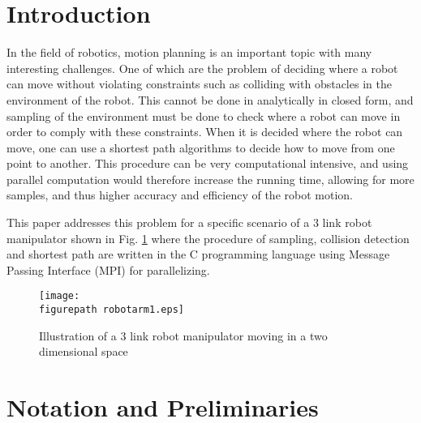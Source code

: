 
\newcommand{\figurepath}{./figures/}
\newcommand{\figurescale}{0.6}
\newcommand{\codepath}{../matlab/}

\section{Introduction}

In the field of robotics, motion planning is an important topic with many interesting challenges. One of which are the problem of deciding where a robot can move without violating constraints such as colliding with obstacles in the environment of the robot. This cannot be done in analytically in closed form, and sampling of the environment must be done to check where a robot can move in order to comply with these constraints. When it is decided where the robot can move, one can use a shortest path algorithms to decide how to move from one point to another. This procedure can be very computational intensive, and using parallel computation would therefore increase the running time, allowing for more samples, and thus higher accuracy and efficiency of the robot motion.
\\  \par
This paper addresses this problem for a specific scenario of a 3 link robot manipulator shown in Fig. \ref{fig:robot1} where the procedure of sampling, collision detection and shortest path are written in the C programming language using Message Passing Interface (MPI) for parallelizing. 

\begin{figure}[h!] 
 \center 
 \texttt{[image: \\figurepath robotarm1.eps]}
 \caption{ Illustration of a 3 link robot manipulator moving in a two dimensional space \label{fig:robot1}}
 \end{figure}


\section{Notation and Preliminaries}

